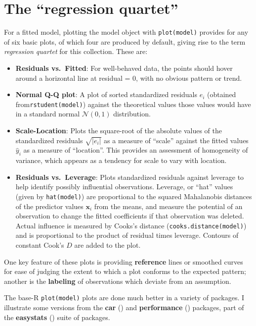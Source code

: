 \documentclass[
  letterpaper,
  10pt,
  krantz2]{krantz}
\begin{document}
{\section{The ``regression quartet''}\label{the-regression-quartet}

For a fitted model, plotting the model object with \texttt{plot(model)}
provides for any of six basic plots, of which four are produced by
default, giving rise to the term \emph{regression quartet} for this
collection. These are:

\begin{itemize}
\item
  \textbf{Residuals vs.~Fitted}: For well-behaved data, the points
  should hover around a horizontal line at residual = 0, with no obvious
  pattern or trend.
\item
  \textbf{Normal Q-Q plot}: A plot of sorted standardized residuals
  \(e_i\) (obtained from\texttt{rstudent(model)}) against the
  theoretical values those values would have in a standard normal
  \(\mathcal{N}(0, 1)\) distribution.
\item
  \textbf{Scale-Location}: Plots the square-root of the absolute values
  of the standardized residuals \(\sqrt{| e_i |}\) as a measure of
  ``scale'' against the fitted values \(\hat{y}_i\) as a measure of
  ``location''. This provides an assessment of homogeneity of variance,
  which appears as a tendency for scale to vary with location.
\item
  \textbf{Residuals vs.~Leverage}: Plots standardized residuals against
  leverage to help identify possibly influential observations. Leverage,
  or ``hat'' values (given by \texttt{hat(model)}) are proportional to
  the squared Mahalanobis distances of the predictor values
  \(\mathbf{x}_i\) from the means, and measure the potential of an
  observation to change the fitted coefficients if that observation was
  deleted. Actual influence is measured by Cooks's distance
  (\texttt{cooks.distance(model)}) and is proportional to the product of
  residual times leverage. Contours of constant Cook's \(D\) are added
  to the plot.
\end{itemize}

One key feature of these plots is providing \textbf{reference} lines or
smoothed curves for ease of judging the extent to which a plot conforms
to the expected pattern; another is the \textbf{labeling} of
observations which deviate from an assumption.

The base-R \texttt{plot(model)} plots are done much better in a variety
of packages. I illustrate some versions from the \textbf{car}
() and \textbf{performance}
()
packages, part of the \textbf{easystats}
() suite of packages.

}
\end{document}
